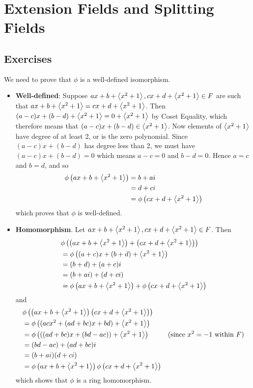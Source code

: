 \section{Extension Fields and Splitting Fields}
\subsection*{Exercises}
\begin{questions}
    \item We need to prove that $\phi$ is a well-defined isomorphism.
    \begin{itemize}
        \item \textbf{Well-defined}: Suppose $ax + b + \left\langle x^2+1\right\rangle, cx + d + \left\langle x^2+1\right\rangle \in F$ are such that $ax + b + \left\langle x^2+1\right\rangle = cx + d + \left\langle x^2+1\right\rangle$. Then $(a - c)x + (b - d) + \left\langle x^2 + 1\right\rangle = 0 + \left\langle x^2+1\right\rangle$ by Coset Equality, which therefore means that $(a-c)x + (b-d) \in \left\langle x^2+1\right\rangle$. Now elements of $\left\langle x^2+1\right\rangle$ have degree of at least 2, or is the zero polynomial. Since $(a-c)x + (b-d)$ has degree less than 2, we must have $(a-c)x + (b-d) = 0$ which means $a - c = 0$ and $b - d = 0$. Hence $a = c$ and $b = d$, and so
        \begin{align*}
            \phi\left(ax + b + \left\langle x^2+1\right\rangle\right) &= b + ai\\
            &= d + ci\\
            &= \phi\left(cx + d + \left\langle x^2+1\right\rangle\right)
        \end{align*}
        which proves that $\phi$ is well-defined.

        \item \textbf{Homomorphism}. Let $ax + b + \left\langle x^2+1\right\rangle, cx + d + \left\langle x^2+1\right\rangle \in F$. Then
        \begin{align*}
            &\phi\left(\left(ax + b + \left\langle x^2+1\right\rangle\right) + \left(cx + d + \left\langle x^2+1\right\rangle\right)\right)\\
            &= \phi\left((a+c)x + (b+d) + \left\langle x^2+1\right\rangle\right)\\
            &= (b+d) + (a+c)i\\
            &= (b+ai) + (d+ci)\\
            &= \phi\left(ax + b + \left\langle x^2+1\right\rangle\right) + \phi\left(cx + d + \left\langle x^2+1\right\rangle\right)
        \end{align*}
        and
        \begin{align*}
            &\phi\left(\left(ax + b + \left\langle x^2+1\right\rangle\right)\left(cx + d + \left\langle x^2+1\right\rangle\right)\right)\\
            &= \phi\left((acx^2 + (ad + bc)x + bd) + \left\langle x^2+1\right\rangle\right)\\
            &= \phi\left(((ad + bc)x + (bd - ac)) + \left\langle x^2+1\right\rangle\right) & (\text{since } x^2 = -1 \text{ within } F)\\
            &= (bd - ac) + (ad + bc)i\\
            &= (b + ai)(d + ci)\\
            &= \phi\left(ax + b + \left\langle x^2+1\right\rangle\right)\phi\left(cx + d + \left\langle x^2+1\right\rangle\right)
        \end{align*}
        which shows that $\phi$ is a ring homomorphism.


\end{itemize}
\end{questions}
